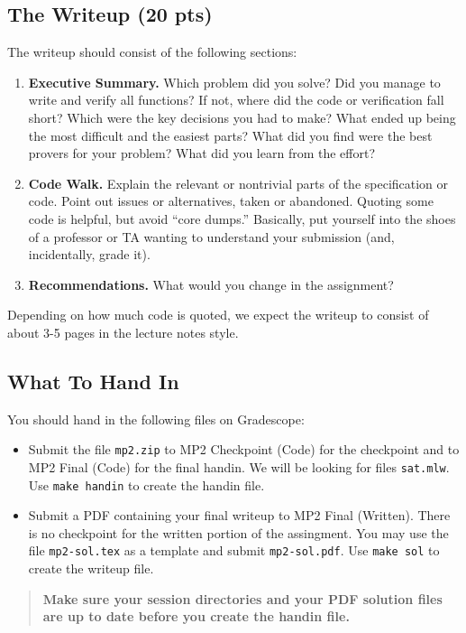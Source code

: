 \documentclass[11pt]{article}
\begin{document}
\subsection*{The Writeup (20 pts)}

The writeup should consist of the following sections:
\begin{enumerate}
\item {\bf{Executive Summary.}}  Which problem did you solve?  Did you manage
  to write and verify all functions?  If not, where did the code or
  verification fall short?  Which were the key decisions you had to
  make?  What ended up being the most difficult and the easiest parts?
  What did you find were the best provers for your problem?  What did
  you learn from the effort?
\item {\bf{Code Walk.}}  Explain the relevant or nontrivial parts of the
  specification or code.  Point out issues or alternatives, taken or
  abandoned.  Quoting some code is helpful, but avoid ``core dumps.''
  Basically, put yourself into the shoes of a professor or TA wanting
  to understand your submission (and, incidentally, grade it).
\item {\bf{Recommendations.}}  What would you change in the assignment?
\end{enumerate}
Depending on how much code is quoted, we expect the writeup to consist of about
3-5 pages in the lecture notes style.


\subsection*{What To Hand In}

You should hand in the following files on Gradescope:
\begin{itemize}
\item Submit the file \texttt{mp2.zip} to MP2 Checkpoint
  (Code) for the checkpoint and to MP2 Final (Code) for the
  final handin.  We will be looking for files \texttt{sat.mlw}.  
  Use \texttt{make handin} to create the handin file.
\item Submit a PDF containing your final writeup to
  MP2 Final (Written).  There is no checkpoint for the
  written portion of the assingment.  You may use the file
  \texttt{mp2-sol.tex} as a template and submit \texttt{mp2-sol.pdf}. 
  Use \texttt{make sol} to create the writeup file.
\end{itemize}

\begin{quote}\bf
  Make sure your session directories and your PDF solution files are
  up to date before you create the handin file.
\end{quote}
\end{document}
